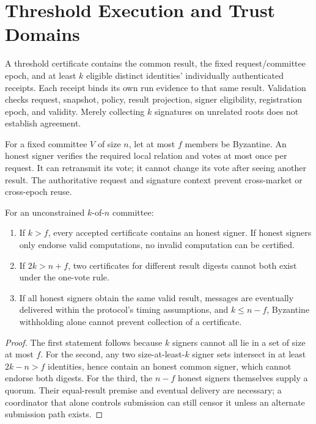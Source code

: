 \section{Threshold Execution and Trust Domains}
\label{sec:threshold}

A threshold certificate contains the common result, the fixed request/committee epoch, and at least $k$ eligible distinct identities' individually authenticated receipts. Each receipt binds its own run evidence to that same result. Validation checks request, snapshot, policy, result projection, signer eligibility, registration epoch, and validity. Merely collecting $k$ signatures on unrelated roots does not establish agreement.

For a fixed committee $V$ of size $n$, let at most $f$ members be Byzantine. An honest signer verifies the required local relation and votes at most once per request. It can retransmit its vote; it cannot change its vote after seeing another result. The authoritative request and signature context prevent cross-market or cross-epoch reuse.

\begin{proposition}
For an unconstrained $k$-of-$n$ committee:
\begin{enumerate}
\item If $k>f$, every accepted certificate contains an honest signer. If honest signers only endorse valid computations, no invalid computation can be certified.
\item If $2k>n+f$, two certificates for different result digests cannot both exist under the one-vote rule.
\item If all honest signers obtain the same valid result, messages are eventually delivered within the protocol's timing assumptions, and $k\leq n-f$, Byzantine withholding alone cannot prevent collection of a certificate.
\end{enumerate}
\end{proposition}
\begin{proof}
The first statement follows because $k$ signers cannot all lie in a set of size at most $f$. For the second, any two size-at-least-$k$ signer sets intersect in at least $2k-n>f$ identities, hence contain an honest common signer, which cannot endorse both digests. For the third, the $n-f$ honest signers themselves supply a quorum. Their equal-result premise and eventual delivery are necessary; a coordinator that alone controls submission can still censor it unless an alternate submission path exists.
\end{proof}

